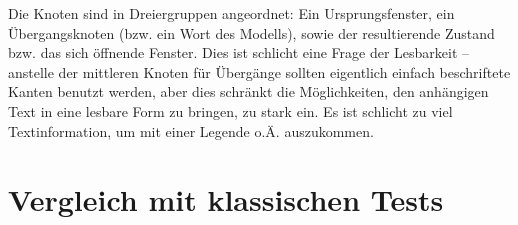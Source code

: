 Die Knoten sind in Dreiergruppen angeordnet: Ein Ursprungsfenster, ein Übergangsknoten
(bzw. ein Wort des Modells), sowie der resultierende Zustand bzw. das sich öffnende Fenster.
Dies ist schlicht eine Frage der Lesbarkeit -- anstelle der mittleren Knoten für Übergänge sollten
eigentlich einfach beschriftete Kanten benutzt werden, aber dies schränkt die Möglichkeiten,
den anhängigen Text in eine lesbare Form zu bringen, zu stark ein. Es ist schlicht zu viel
Textinformation, um mit einer Legende o.Ä. auszukommen.


\section{Vergleich mit klassischen Tests}\label{section:testcomparisonclassic}

